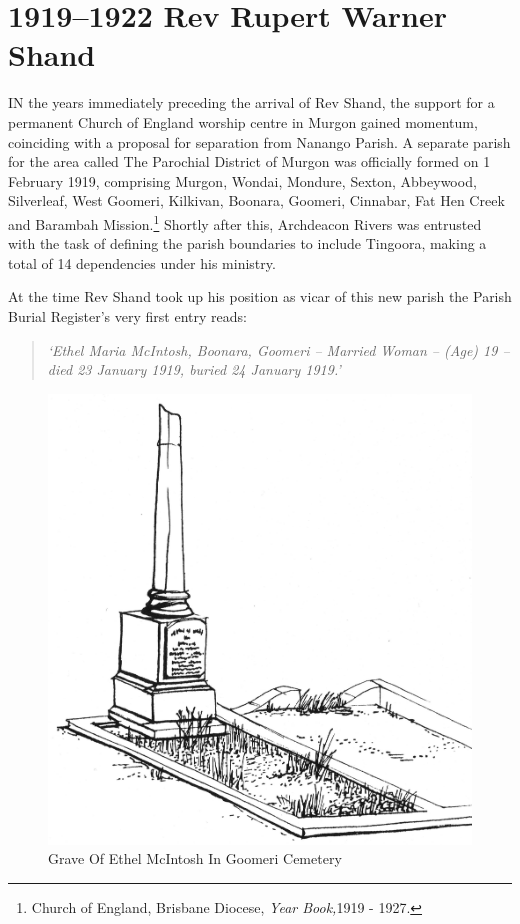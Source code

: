 \balance


\printendnotes[custom]
\setcounter{endnote}{0}
\chapter{1919--1922 Rev Rupert Warner Shand}
\nobalance


\lettrine[lines=3]{I}{N}
 the years immediately preceding the arrival of Rev Shand, the support for a permanent Church of England worship centre in Murgon gained momentum, coinciding with a proposal for separation from Nanango Parish. A separate parish for the area called The Parochial District of Murgon was officially formed on 1 February 1919, comprising Murgon, Wondai, Mondure, Sexton, Abbeywood, Silverleaf, West Goomeri, Kilkivan, Boonara, Goomeri, Cinnabar, Fat Hen Creek and Barambah Mission.\footnote{Church of England, Brisbane Diocese, \emph{Year Book,}1919 - 1927.} Shortly after this, Archdeacon Rivers was entrusted with the task of defining the parish boundaries to include Tingoora, making a total of 14 dependencies under his ministry.

At the time Rev Shand took up his position as vicar of this new parish the Parish Burial Register's very first entry reads:



\begin{quote}

\emph{`Ethel Maria McIntosh, Boonara, Goomeri -- Married Woman -- (Age) 19 -- died 23 January 1919, buried 24 January 1919.'}

\end{quote}









\begin{figure}
\begin{center}
\includegraphics[width=.7\linewidth,center]{../images/graveOfEthelMcIntoshInGoomeriCemetery.jpg}
\caption{Grave Of Ethel McIntosh In Goomeri Cemetery}
\end{center}
\end{figure}




